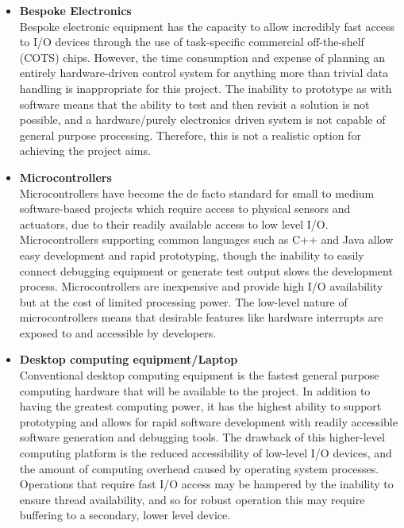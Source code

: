 \documentclass[main.tex]{subfiles}
\begin{document}
\begin{itemize}
\item \textbf{Bespoke Electronics}\\
Bespoke electronic equipment has the capacity to allow incredibly fast access to I/O devices through the use of task-specific commercial off-the-shelf (COTS) chips. However, the time consumption and expense of planning an entirely hardware-driven control system for anything more than trivial data handling is inappropriate for this project. The inability to prototype as with software means that the ability to test and then revisit a solution is not possible, and a hardware/purely electronics driven system is not capable of general purpose processing. Therefore, this is not a realistic option for achieving the project aims.
% 
\item \textbf{Microcontrollers}\\
Microcontrollers have become the de facto standard for small to medium software-based projects which require access to physical sensors and actuators, due to their readily available access to low level I/O. Microcontrollers supporting common languages such as C++ and Java allow easy development and rapid prototyping, though the inability to easily connect debugging equipment or generate test output slows the development process. Microcontrollers are inexpensive and provide high I/O availability but at the cost of limited processing power. The low-level nature of microcontrollers means that desirable features like hardware interrupts are exposed to and accessible by developers. 
\item \textbf{Desktop computing equipment/Laptop} \\
Conventional desktop computing equipment is the fastest general purpose computing hardware that will be available to the project. In addition to having the greatest computing power, it has the highest ability to support prototyping and allows for rapid software development with readily accessible software generation and debugging tools. The drawback of this higher-level computing platform is the reduced accessibility of low-level I/O devices, and the amount of computing overhead caused by operating system processes. Operations that require fast I/O access may be hampered by the inability to ensure thread availability, and so for robust operation this may require buffering to a secondary, lower level device.
\end{itemize}
\end{document}
